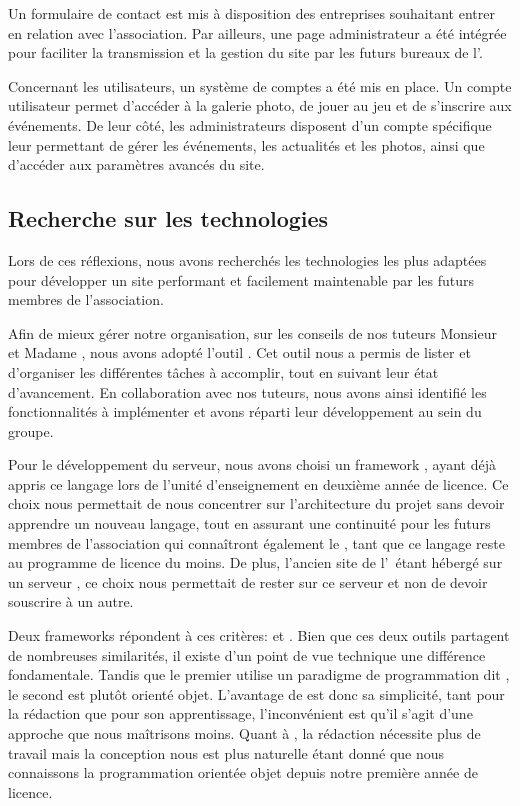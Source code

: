 Un formulaire de contact est mis à disposition des entreprises souhaitant entrer en relation avec l’association. Par ailleurs, une page administrateur a été intégrée pour faciliter la transmission et la gestion du site par les futurs bureaux de l’\ofni.  

Concernant les utilisateurs, un système de comptes a été mis en place. Un compte utilisateur permet d’accéder à la galerie photo, de jouer au jeu et de s’inscrire aux événements. De leur côté, les administrateurs disposent d’un compte spécifique leur permettant de gérer les événements, les actualités et les photos, ainsi que d’accéder aux paramètres avancés du site.

\subsection{Recherche sur les technologies}

Lors de ces réflexions, nous avons recherchés les technologies les plus adaptées pour développer un site performant et facilement maintenable par les futurs membres de l’association.
\bigskip

Afin de mieux gérer notre organisation, sur les conseils de nos tuteurs Monsieur  et Madame , nous avons adopté l’outil . Cet outil nous a permis de lister et d’organiser les différentes tâches à accomplir, tout en suivant leur état d'avancement. En collaboration avec nos tuteurs, nous avons ainsi identifié les fonctionnalités à implémenter et avons réparti leur développement au sein du groupe.
\bigskip

Pour le développement du serveur, nous avons choisi un framework , ayant déjà appris ce langage lors de l’unité d’enseignement  en deuxième année de licence. Ce choix nous permettait de nous concentrer sur l’architecture du projet sans devoir apprendre un nouveau langage, tout en assurant une continuité pour les futurs membres de l’association qui connaîtront également le , tant que ce langage reste au programme de licence du moins.
De plus, l'ancien site de l'\ofni\ étant hébergé sur un serveur , ce choix nous permettait de rester sur ce serveur et non de devoir souscrire à un autre.
\bigskip

Deux frameworks répondent à ces critères:  et . Bien que ces deux outils partagent de nombreuses similarités, il existe d'un point de vue technique une différence fondamentale. Tandis que le premier utilise un paradigme de programmation dit , le second est plutôt orienté objet. L'avantage de  est donc sa simplicité, tant pour la rédaction que pour son apprentissage, l'inconvénient est qu'il s'agit d'une approche que nous maîtrisons moins. Quant à , la rédaction nécessite plus de travail mais la conception nous est plus naturelle étant donné que nous connaissons la programmation orientée objet depuis notre première année de licence.
\pagebreak


